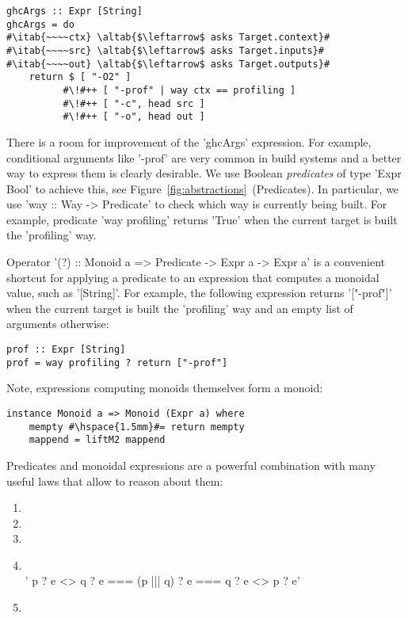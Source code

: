 \begin{lstlisting}
ghcArgs :: Expr [String]
ghcArgs = do
#\itab{~~~~ctx} \altab{$\leftarrow$ asks Target.context}#
#\itab{~~~~src} \altab{$\leftarrow$ asks Target.inputs}#
#\itab{~~~~out} \altab{$\leftarrow$ asks Target.outputs}#
    return $ [ "-O2" ]
          #\!#++ [ "-prof" | way ctx == profiling ]
          #\!#++ [ "-c", head src ]
          #\!#++ [ "-o", head out ]
\end{lstlisting}

There is a room for improvement of the \lst'ghcArgs' expression. For
example, conditional arguments like \lst'-prof' are very common in build
systems and a better way to express them is clearly desirable. We use Boolean
\emph{predicates} of type \lst'Expr Bool' to achieve this, see
Figure~\ref{fig:abstractions}~(Predicates). In particular, we
use \lst'way :: Way -> Predicate' to check which way is currently being built.
For example, predicate \lst'way profiling' returns \lst'True' when the
current target is built the \lst'profiling' way.

Operator \lst'(?) :: Monoid a => Predicate -> Expr a -> Expr a' is a
convenient shortcut for applying a predicate to an expression that computes a monoidal value, such
as \lst'[String]'. For example, the following expression returns
\lst'["-prof"]' when the current target is built the \lst'profiling' way and an
empty list of arguments otherwise:

\begin{lstlisting}
prof :: Expr [String]
prof = way profiling ? return ["-prof"]
\end{lstlisting}

\noindent Note, expressions computing monoids themselves form a monoid:

\begin{lstlisting}
instance Monoid a => Monoid (Expr a) where
    mempty #\hspace{1.5mm}#= return mempty
    mappend = liftM2 mappend
\end{lstlisting}

\noindent Predicates and monoidal expressions are a powerful combination with
many useful laws that allow to reason about them:
\begin{enumerate}
  \item {} 
  \item {} 
  \item {} 
  \item {}  \vspace{1mm}\\
  \lst'    p ? e <> q ? e === (p ||| q) ? e === q ? e <> p ? e'
  \item {} 
\end{enumerate}

